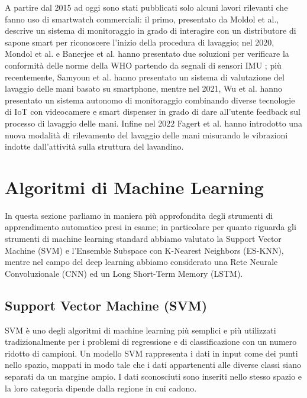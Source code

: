 A partire dal 2015 ad oggi sono stati pubblicati solo alcuni lavori rilevanti che fanno uso di smartwatch commerciali: il primo, presentato da Moldol et al., descrive un sistema di monitoraggio in grado di interagire con un distributore di sapone smart per riconoscere l'inizio della procedura di lavaggio\cite{mondol2015harmony}; nel 2020, Mondol et al. e Banerjee et al. hanno presentato due soluzioni per verificare la conformità delle norme della WHO partendo da segnali di sensori IMU \cite{mondol2020hawad}\cite{banerjee2020hand}; più recentemente, Samyoun et al. hanno presentato un sistema di valutazione del lavaggio delle mani basato su smartphone\cite{samyoun2021iwash}, mentre nel 2021, Wu et al. hanno presentato un sistema autonomo di monitoraggio combinando diverse tecnologie di IoT con videocamere e smart dispenser in grado di dare all'utente feedback sul processo di lavaggio delle mani. Infine nel 2022 Fagert et al. hanno introdotto una nuova modalità di rilevamento del lavaggio delle mani misurando le vibrazioni indotte dall'attività sulla struttura del lavandino\cite{fagert2022clean}.

\section{Algoritmi di Machine Learning}
\label{sec:algoritmi-di-machine-learning}

In questa sezione parliamo in maniera più approfondita degli strumenti di apprendimento automatico presi in esame; in particolare per quanto riguarda gli strumenti di machine learning standard abbiamo valutato la Support Vector Machine (SVM) e l'Ensemble Subspace con K-Nearest Neighbors (ES-KNN), mentre nel campo del deep learning abbiamo considerato una Rete Neurale Convoluzionale (CNN) ed un Long Short-Term Memory (LSTM).

\subsection{Support Vector Machine (SVM)}
\label{ssec:support-vector-machine}

SVM è uno degli algoritmi di machine learning più semplici e più utilizzati tradizionalmente per i problemi di regressione e di classificazione con un numero ridotto di campioni.
Un modello SVM rappresenta i dati in input come dei punti nello spazio, mappati in modo tale che i dati appartenenti alle diverse classi siano separati da un margine ampio. I dati sconosciuti sono inseriti nello stesso spazio e la loro categoria dipende dalla regione in cui cadono.

